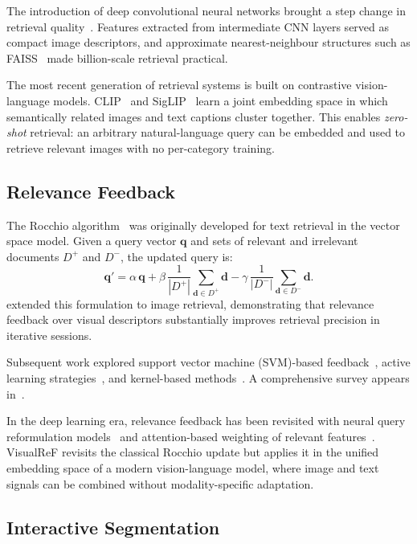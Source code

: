 \documentclass[12pt,a4paper]{article}
\newcommand{\vq}{\bm{q}}
\newcommand{\vd}{\bm{d}}
\begin{document}
The introduction of deep convolutional neural networks brought a step change
in retrieval quality~\citep{Babenko2014,Tolias2016}. Features extracted from
intermediate CNN layers served as compact image descriptors, and approximate
nearest-neighbour structures such as
FAISS~\citep{Johnson2019} made billion-scale retrieval practical.

The most recent generation of retrieval systems is built on contrastive
vision-language models. CLIP~\citep{Radford2021} and SigLIP~\citep{Zhai2023}
learn a joint embedding space in which semantically related images and text
captions cluster together. This enables \emph{zero-shot} retrieval: an
arbitrary natural-language query can be embedded and used to retrieve relevant
images with no per-category training.

\subsection{Relevance Feedback}

The Rocchio algorithm~\citep{Rocchio1971} was originally developed for text
retrieval in the vector space model. Given a query vector $\vq$ and sets of
relevant and irrelevant documents $D^+$ and $D^-$, the updated query is:
\begin{equation}
  \vq' = \alpha\,\vq
       + \beta\,\frac{1}{|D^+|}\sum_{\vd \in D^+} \vd
       - \gamma\,\frac{1}{|D^-|}\sum_{\vd \in D^-} \vd.
  \label{eq:rocchio_text}
\end{equation}
\citet{Rui1998} extended this formulation to image retrieval, demonstrating
that relevance feedback over visual descriptors substantially improves
retrieval precision in iterative sessions.

Subsequent work explored support vector machine (SVM)-based
feedback~\citep{Tong2001}, active learning
strategies~\citep{Tong2001active}, and kernel-based
methods~\citep{Gosselin2004}. A comprehensive survey appears
in~\citet{Zhou2003}.

In the deep learning era, relevance feedback has been revisited with
neural query reformulation models~\citep{Jiang2015} and attention-based
weighting of relevant features~\citep{Yu2021}. VisualReF revisits the
classical Rocchio update but applies it in the unified embedding space of a
modern vision-language model, where image and text signals can be combined
without modality-specific adaptation.

\subsection{Interactive Segmentation}
\end{document}
